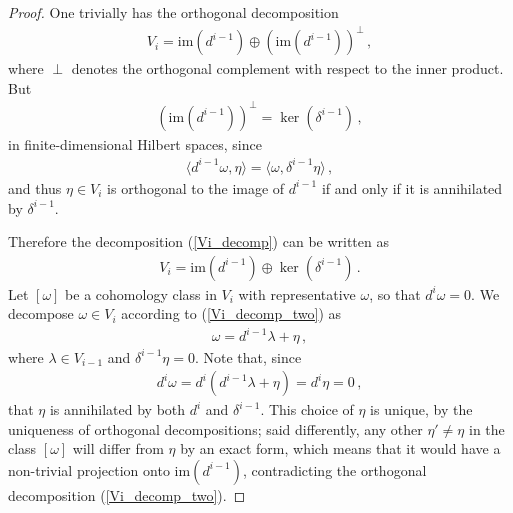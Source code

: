 \documentclass[12pt]{article}
\newcommand{\im}{\mathrm{im}}
\numberwithin{equation}{section}
\begin{document}
\begin{proof}
    One trivially has the orthogonal decomposition
    \begin{align}\label{Vi_decomp}
        V_i = \mathrm{im} \left( d^{i-1} \right) \oplus \left( \mathrm{im} \left( d^{i-1} \right) \right)^\perp \, ,
    \end{align}
    where $\perp$ denotes the orthogonal complement with respect to the inner product. But 
    \begin{align}
        \left( \mathrm{im} \left( d^{i-1} \right) \right)^\perp = \ker \left( \delta^{i-1} \right) \, ,
    \end{align}
    in finite-dimensional Hilbert spaces, since
    \begin{align}
        \langle d^{i-1} \omega , \eta \rangle = \langle \omega, \delta^{i - 1} \eta \rangle \, ,
    \end{align}
    and thus $\eta \in V_i$ is orthogonal to the image of $d^{i-1}$ if and only if it is annihilated by $\delta^{i - 1}$.

    Therefore the decomposition (\ref{Vi_decomp}) can be written as
    \begin{align}\label{Vi_decomp_two}
        V_i = \im \left( d^{i-1} \right) \oplus \ker \left( \delta^{i - 1} \right) \, .
    \end{align}
    Let $[\omega]$ be a cohomology class in $V_i$ with representative $\omega$, so that $d^i \omega = 0$. We decompose $\omega \in V_i$ according to (\ref{Vi_decomp_two}) as
    \begin{align}
        \omega = d^{i-1} \lambda + \eta \, ,
    \end{align}
    where $\lambda \in V_{i-1}$ and $\delta^{i-1} \eta = 0$. Note that, since
    \begin{align}
        d^i \omega = d^i \left( d^{i-1} \lambda + \eta \right) = d^i \eta = 0 \, ,
    \end{align}
    that $\eta$ is annihilated by both $d^i$ and $\delta^{i-1}$. This choice of $\eta$ is unique, by the uniqueness of orthogonal decompositions; said differently, any other $\eta' \neq \eta$ in the class $[\omega]$ will differ from $\eta$ by an exact form, which means that it would have a non-trivial projection onto $\im ( d^{i-1} )$, contradicting the orthogonal decomposition (\ref{Vi_decomp_two}).


\end{proof}
\end{document}
